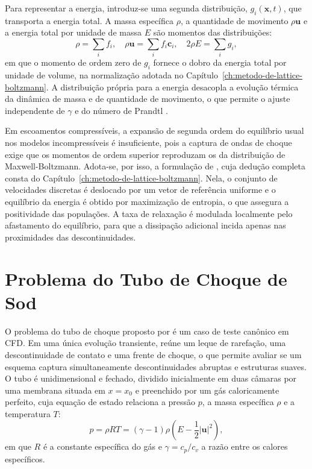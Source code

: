 Para representar a energia, introduz-se uma segunda distribuição, $g_i(\mathbf{x}, t)$, que transporta a energia total.
A massa específica $\rho$, a quantidade de movimento $\rho \mathbf{u}$ e a energia total por unidade de massa $E$ são momentos das distribuições:
\begin{equation}
    \rho = \sum_i f_i, \quad \rho \mathbf{u} = \sum_i f_i \mathbf{c}_i, \quad 2 \rho E = \sum_i g_i, \label{eq:momentos-macroscopicos}
\end{equation}
em que o momento de ordem zero de $g_i$ fornece o dobro da energia total por unidade de volume, na normalização adotada no Capítulo~\ref{ch:metodo-de-lattice-boltzmann}.
A distribuição própria para a energia desacopla a evolução térmica da dinâmica de massa e de quantidade de movimento, o que permite o ajuste independente de $\gamma$ e do número de Prandtl \parencite{Tran2022}.

Em escoamentos compressíveis, a expansão de segunda ordem do equilíbrio usual nos modelos incompressíveis é insuficiente, pois a captura de ondas de choque exige que os momentos de ordem superior reproduzam os da distribuição de Maxwell-Boltzmann.
Adota-se, por isso, a formulação de \textcite{Tran2022}, cuja dedução completa consta do Capítulo~\ref{ch:metodo-de-lattice-boltzmann}.
Nela, o conjunto de velocidades discretas é deslocado por um vetor de referência uniforme e o equilíbrio da energia é obtido por maximização de entropia, o que assegura a positividade das populações.
A taxa de relaxação é modulada localmente pelo afastamento do equilíbrio, para que a dissipação adicional incida apenas nas proximidades das descontinuidades.


\section{Problema do Tubo de Choque de Sod}\label{sec:problema-do-tubo-de-choque-de-sod}

O problema do tubo de choque proposto por \textcite{Sod1978} é um caso de teste canônico em CFD.
Em uma única evolução transiente, reúne um leque de rarefação, uma descontinuidade de contato e uma frente de choque, o que permite avaliar se um esquema captura simultaneamente descontinuidades abruptas e estruturas suaves.
O tubo é unidimensional e fechado, dividido inicialmente em duas câmaras por uma membrana situada em $x = x_0$ e preenchido por um gás caloricamente perfeito, cuja equação de estado relaciona a pressão $p$, a massa específica $\rho$ e a temperatura $T$:
\begin{equation}
    p = \rho R T = (\gamma - 1) \rho \left( E - \frac{1}{2} |\mathbf{u}|^2 \right), \label{eq:gas-ideal}
\end{equation}
em que $R$ é a constante específica do gás e $\gamma = c_p/c_v$ a razão entre os calores específicos.

